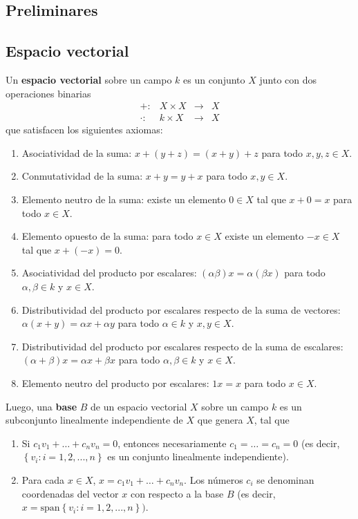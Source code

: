 \begin{multicols}{2}

\chapter{Preliminares}

\section{Espacio vectorial}

Un \textbf{espacio vectorial} sobre un campo $k$ es un conjunto $X$ junto con dos operaciones binarias 
    $$
    \begin{array}{rccl}
	+: &X \times X &\to& X \\
	\cdot:& k \times X &\to& X
    \end{array}
    $$
    que satisfacen los siguientes axiomas:
    \begin{enumerate}[\bfseries (i)]
	    \item Asociatividad de la suma: $x+(y+z) = (x+y)+z$ para todo $x,y,z \in X$.
	    \item Conmutatividad de la suma: $x+y = y+x$ para todo $x,y \in X$.
	    \item Elemento neutro de la suma: existe un elemento $0 \in X$ tal que $x+0 = x$ para todo $x \in X$.
	    \item Elemento opuesto de la suma: para todo $x \in X$ existe un elemento $-x \in X$ tal que $x+(-x) = 0$.
	    \item Asociatividad del producto por escalares: $(\alpha \beta)x = \alpha(\beta x)$ para todo $\alpha,\beta \in k$ y $x \in X$.
	    \item Distributividad del producto por escalares respecto de la suma de vectores: $\alpha(x+y) = \alpha x + \alpha y$ para todo $\alpha \in k$ y $x,y \in X$.
	    \item Distributividad del producto por escalares respecto de la suma de escalares: $(\alpha + \beta)x = \alpha x + \beta x$ para todo $\alpha,\beta \in k$ y $x \in X$.
	    \item Elemento neutro del producto por escalares: $1x = x$ para todo $x \in X$.
    \end{enumerate}

Luego, una \textbf{base} $B$ de un espacio vectorial $X$ sobre un campo $k$ es un subconjunto linealmente independiente de $X$ que genera $X$, tal que
    \begin{enumerate}[\bfseries (i)]
	\item  Si $c_1v_1 +\ldots + c_nv_n = 0$, entonces necesariamente $c_1 =\ldots= c_n = 0$ (es decir, $\left\{v_i : i = 1, 2,..., n\right\}$ es un conjunto linealmente independiente). 
	\item Para cada $x \in X$, $x = c_1v_1 +\ldots+ c_nv_n$. Los números $c_i$ se denominan coordenadas del vector $x$ con respecto a la base $B$ (es decir, $x = \text{span}\left\{v_i : i = 1, 2,..., n\right\})$.
    \end{enumerate}


\end{multicols}
